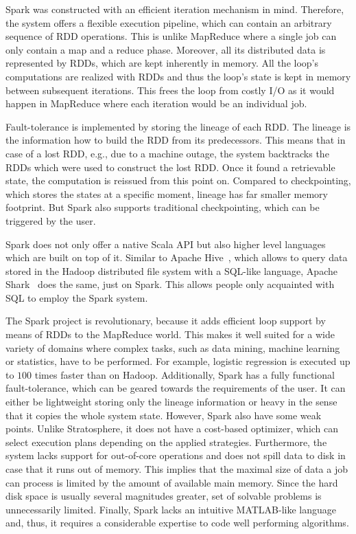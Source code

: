 Spark was constructed with an efficient iteration mechanism in mind.
Therefore, the system offers a flexible execution pipeline, which can contain an arbitrary sequence of RDD operations.
This is unlike MapReduce where a single job can only contain a map and a reduce phase.
Moreover, all its distributed data is represented by RDDs, which are kept inherently in memory.
All the loop's computations are realized with RDDs and thus the loop's state is kept in memory between subsequent iterations.
This frees the loop from costly I/O as it would happen in MapReduce where each iteration would be an individual job.

Fault-tolerance is implemented by storing the lineage of each RDD.
The lineage is the information how to build the RDD from its predecessors.
This means that in case of a lost RDD, e.g., due to a machine outage, the system backtracks the RDDs which were used to construct the lost RDD.
Once it found a retrievable state, the computation is reissued from this point on.
Compared to checkpointing, which stores the states at a specific moment, lineage has far smaller memory footprint.
But Spark also supports traditional checkpointing, which can be triggered by the user.

Spark does not only offer a native Scala API but also higher level languages which are built on top of it.
Similar to Apache Hive~\cite{hive}, which allows to query data stored in the Hadoop distributed file system with a SQL-like language, Apache Shark~\cite{xin:2013a} does the same, just on Spark.
This allows people only acquainted with SQL to employ the Spark system.

The Spark project is revolutionary, because it adds efficient loop support by means of RDDs to the MapReduce world.
This makes it well suited for a wide variety of domains where complex tasks, such as data mining, machine learning or statistics, have to be performed.
For example, logistic regression is executed up to $100$ times faster than on Hadoop.
Additionally, Spark has a fully functional fault-tolerance, which can be geared towards the requirements of the user.
It can either be lightweight storing only the lineage information or heavy in the sense that it copies the whole system state.
However, Spark also have some weak points.
Unlike Stratosphere, it does not have a cost-based optimizer, which can select execution plans depending on the applied strategies.
Furthermore, the system lacks support for out-of-core operations and does not spill data to disk in case that it runs out of memory.
This implies that the maximal size of data a job can process is limited by the amount of available main memory.
Since the hard disk space is usually several magnitudes greater, set of solvable problems is unnecessarily limited.
Finally, Spark lacks an intuitive MATLAB-like language and, thus, it requires a considerable expertise to code well performing algorithms.

